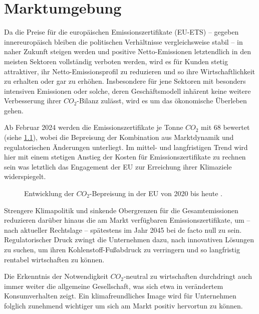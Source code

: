 \chapter{Marktumgebung}

Da die Preise für die europäischen Emissionszertifikate (EU-ETS) -- gegeben innereuropäisch bleiben die politischen Verhältnisse vergleichsweise stabil -- in naher Zukunft steigen werden und positive Netto-Emissionen letztendlich in den meisten Sektoren vollständig verboten werden, wird es für Kunden stetig attraktiver, ihr Netto-Emissionsprofil zu reduzieren und so ihre Wirtschaftlichkeit zu erhalten oder gar zu erhöhen.
Insbesondere für jene Sektoren mit besonders intensiven Emissionen oder solche, deren Geschäftsmodell inhärent keine weitere Verbesserung ihrer \(CO_2\)-Bilanz zulässt, wird es um das ökonomische Überleben gehen.

Ab Februar 2024 werden die Emissionszertifikate je Tonne \(CO_2\) mit \qty{68}{\EUR} bewertet (siehe \cref{fig:carbon price tracker}), wobei die Bepreisung der Kombination aus Marktdynamik und regulatorischen Änderungen unterliegt.
Im mittel- und langfristigen Trend wird hier mit einem stetigen Anstieg der Kosten für Emissionszertifikate zu rechnen sein was letztlich das Engagement der EU zur Erreichung ihrer Klimaziele widerspiegelt.

\begin{figure}[h]
    \centering
    
    \caption[Entwicklung der \(CO_2\)-Bepreisung in der EU]{Entwicklung der \(CO_2\)-Bepreisung in der EU von 2020 bis heute \cite{Statista2023.AvPriceEUETS}.}\label{fig:carbon price tracker}
\end{figure}

Strengere Klimapolitik und sinkende Obergrenzen für die Gesamtemissionen reduzieren darüber hinaus die am Markt verfügbaren Emissionszertifikate, um -- nach aktueller Rechtslage -- spätestens im Jahr 2045 bei de facto null zu sein.
Regulatorischer Druck zwingt die Unternehmen dazu, nach innovativen Lösungen zu suchen, um ihren Kohlenstoff-Fußabdruck zu verringern und so langfristig rentabel wirtschaften zu können.

Die Erkenntnis der Notwendigkeit \(CO_2\)-neutral zu wirtschaften durchdringt auch immer weiter die allgemeine Gesellschaft, was sich etwa in verändertem Konsumverhalten zeigt.
Ein klimafreundliches Image wird für Unternehmen folglich zunehmend wichtiger um sich am Markt positiv hervortun zu können.\par\medskip

